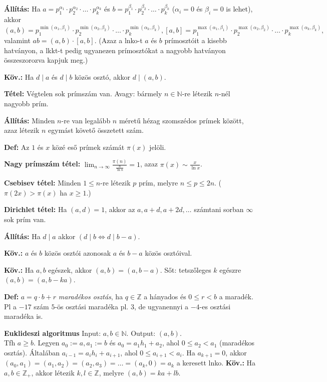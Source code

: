 \documentclass[a4paper, 12pt]{article}
\newcommand{\defi}{{\bf Def:} }
\newcommand{\tetel}{{\bf Tétel:} }
\newcommand{\kov}{{\bf Köv.:} }
\newcommand{\all}{{\bf Állítás:} }
\newcommand{\Z}{{\mathbb Z}}
\newcommand{\N}{{\mathbb N}}
\begin{document}
\all Ha $a=p_1^{\alpha_1}\cdot p_2^{\alpha_2}\cdot\ldots\cdot
p_k^{\alpha_k}$ és $b=p_1^{\beta_1}\cdot p_2^{\beta_2}\cdot\ldots\cdot
p_k^{\beta_k}$ ($\alpha_i=0$ és $\beta_i=0$ is lehet), akkor\\
$(a,b)= p_1^{\min(\alpha_1, \beta_1)}\cdot p_2^{\min(\alpha_2,
  \beta_2)}\cdot\ldots\cdot p_k^{\min(\alpha_k, \beta_k)}, 
[a,b]= p_1^{\max(\alpha_1, \beta_1)}\cdot p_2^{\max(\alpha_2,
  \beta_2)}\cdot\ldots\cdot p_k^{\max(\alpha_k, \beta_k)},$\\
valamint $ab=(a,b)\cdot [a,b]$. (Azaz a lnko-t $a$ és $b$ prímosztóit a
kisebb hatványon, a lkkt-t pedig ugyanezen prímosztókat a nagyobb hatványon
összeszorozva kapjuk meg.)

\kov Ha $d\mid a$ és $d\mid b$ közös osztó, akkor $d\mid (a,b)$.

\tetel Végtelen sok prímszám van. Avagy: bármely $n\in\N$-re létezik
$n$-nél nagyobb prím.

\all Minden $n$-re van legalább $n$ méretű hézag szomszédos prímek között,
azaz létezik $n$ egymást követő összetett szám.

\defi Az $1$ és $x$ közé eső prímek számát $\pi(x)$ jelöli.

{\bf Nagy prímszám tétel:} $\lim_{n\to\infty}\frac{\pi(n)}{\frac n{\ln
    n}}=1$, azaz $\pi(x)\sim \frac x{\ln x}$.

{\bf Csebisev tétel:} Minden $1\le n$-re létezik $p$ prím, melyre $n\le
p\le2n$. ($\pi(2x)>\pi(x)$ ha $x\ge 1$.)

{\bf Dirichlet tétel:} Ha $(a,d)=1$, akkor az $a,a+d,a+2d,\ldots$ számtani
sorban $\infty$ %
sok prím van.


\all Ha $d\mid a$ akkor $(d\mid b \iff d\mid b-a)$.

\kov $a$ és $b$ közös osztói azonosak $a$ és $b-a$ közös osztóival.

\kov Ha $a,b$ egészek, akkor $(a,b)=(a,b-a)$. Sőt: tetszőleges $k$ egészre
$(a,b)=(a,b-ka)$. 

\defi $a=q\cdot b +r$ \emph{maradékos osztás}, ha $q\in \Z$ a hányados és
$0\le r< b$ a maradék.\\
Pl a $-17$ szám $5$-ös osztási maradéka pl. $3$, de ugyanennyi a $-4$-es
osztási maradéka is.

{\bf Euklideszi algoritmus} Input: $a,b \in \N$. Output: $(a,b)$.\\
Tfh $a\ge b$. Legyen $a_0:=a, a_1:=b$ és $a_0=a_1h_1+a_2$, ahol $0\le
a_2<a_1$ (maradékos osztás). Általában $a_{i-1}=a_{i}h_{i}+a_{i+1}$, ahol
$0\le a_{i+1}<a_{i}$. Ha $a_{k+1}=0$, akkor $(a_0,a_1)=(a_1,a_2)=(a_2,a_3)=
\ldots =(a_k,0)=a_k$ a keresett lnko.
\hfill
\kov Ha $a,b\in \Z_+$,
akkor létezik $k,l\in \Z$,
melyre $(a,b)=ka+lb$.
\end{document}
